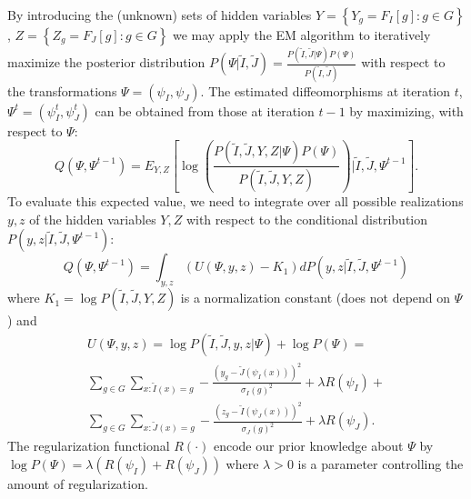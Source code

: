 By introducing the (unknown) sets of hidden variables $Y = \left\lbrace Y_{g}=F_{I}[g] : g\in G \right\rbrace$, $Z = \left\lbrace Z_g = F_{J}[g] : g \in G\right\rbrace$ we may
apply the EM algorithm to iteratively maximize the posterior distribution
$P(\Psi | \tilde{I}, \tilde{J}) = \frac{P(\tilde{I}, \tilde{J} | \Psi)P(\Psi)}{P(\tilde{I}, \tilde{J})}$ with respect to the transformations
$\Psi = (\psi_{I}, \psi_{J})$. The estimated diffeomorphisms at iteration $t$, $\Psi^{t} = \left( \psi_{I}^{t}, \psi_{J}^{t}\right)$ can be obtained from those at iteration
$t-1$ by maximizing, with respect to $\Psi$:
\begin{equation}
	Q(\Psi, \Psi^{t-1}) = E_{Y,Z}\left[\log \left( \frac{P(\tilde{I}, \tilde{J}, Y, Z|\Psi)P(\Psi)}{P(\tilde{I}, \tilde{J}, Y, Z)}\right) | \tilde{I}, \tilde{J}, \Psi^{t-1}\right].
\end{equation}
To evaluate this expected value, we need to integrate over all possible realizations $y, z$ of the hidden variables $Y, Z$ with respect to the conditional distribution $P(y,z| \tilde{I}, \tilde{J}, \Psi^{t-1})$:
\begin{equation}\label{eq:expected_value}
Q(\Psi, \Psi^{t-1}) = \int_{y,z} (U(\Psi, y, z) - K_1)dP(y,z| \tilde{I}, \tilde{J}, \Psi^{t-1})
\end{equation}
where $K_{1} =\log P(\tilde{I}, \tilde{J}, Y, Z)$ is a normalization constant (does not depend on $\Psi$) and
\begin{align}\label{eq:SyNEM_objective}
	U(\Psi, y, z) = \log P(\tilde{I}, \tilde{J}, y, z|\Psi) + \log P(\Psi)=\\
    \nonumber\sum_{g\in G} \sum_{x : \tilde{I}(x) = g} -\frac{\left(y_g - \tilde{J}(\psi_{I}(x))\right)^{2}}{\sigma_{I}(g)^{2}} + \lambda R(\psi_{I})+\\
    \nonumber\sum_{g\in G} \sum_{x : \tilde{J}(x) = g} -\frac{\left(z_g - \tilde{I}(\psi_{J}(x))\right)^{2}}{\sigma_{J}(g)^{2}} + \lambda R(\psi_{J}).
\end{align}
The regularization functional $R(\cdot)$ encode our prior knowledge about $\Psi$ by $\log P(\Psi) = \lambda \left( R(\psi_{I}) + R(\psi_{J})\right)$ where $\lambda > 0$ is a parameter controlling the amount of regularization.\\

